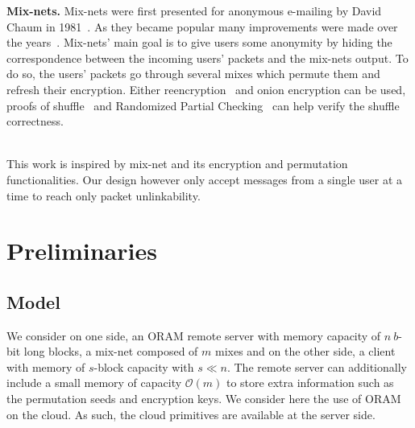 \documentclass{llncs}
\begin{document}
\noindent\textbf{Mix-nets.}
Mix-nets were first presented for anonymous e-mailing by David Chaum in 1981~\cite{chaum1981untraceable}. As they became popular many improvements were made over the years~\cite{moller2003mixmaster,danezis2003mixminion,danezis2004minx,danezis2009sphinx}. Mix-nets' main goal is to give users some anonymity by hiding the correspondence between the incoming users' packets and the mix-nets output. To do so, the users' packets go through several mixes which permute them and refresh their encryption. Either reencryption~\cite{wikstrom2006adaptively} and onion encryption can be used, proofs of shuffle~\cite{groth2007verifiable,groth2007non,bayer2012efficient} and Randomized Partial Checking~\cite{jakobsson2002making} can help verify the shuffle correctness.\\\

This work is inspired by mix-net and its encryption and permutation functionalities. Our design however only accept messages from a single user at a time to reach only packet unlinkability.
%
\section{Preliminaries}\label{Prelim}
%
\subsection{Model}\label{Model}
We consider on one side, an ORAM remote server with memory capacity of $n\ b$-bit long blocks, a mix-net composed of $m$ mixes and on the other side, a client with memory of $s$-block capacity with $s\ll n$. The remote server can additionally include a small memory of capacity $\mathcal{O}(m)$ to store extra information such as the permutation seeds and encryption keys. We consider here the use of ORAM on the cloud. As such, the cloud primitives are available at the server side. 
\iffalse
\begin{itemize}
 \item get(index): Returns the record located at $index$.
 \item get\_range($index_i$, $index_j$): Returns the records comprised between $index_i$ and $index_j$.
 \item put(index, data\_block):  Writes the data block at $index$, returns an error if the data block is too large.
 \item put\_range($index_i$, $index_j$, data\_blocks): Writes the data blocks between $index_i$ and $index_j$, returns an error if the data block are too large.
\end{itemize}
\fi
\end{document}
